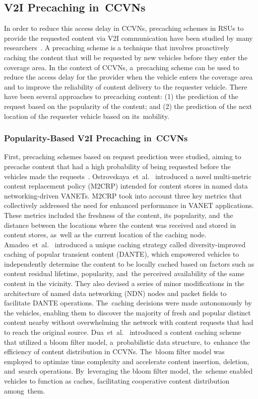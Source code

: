 \documentclass[sensors,aricle,accept,pdftex,moreauthors]{Definitions/mdpi}
\begin{document}
\subsection{V2I Precaching in~CCVNs}
In order to reduce this access delay in CCVNs, precaching schemes in RSUs to provide the requested content via V2I communication have been studied by many researchers~\cite{Ostrovskaya2018, Amadeo2021, Dua2019, Zhe2020, Park2019, Khelifi2018}.
A precaching scheme is a technique that involves proactively caching the content that will be requested by new vehicles before they enter the coverage area.
In the context of CCVNs, a~precaching scheme can be used to reduce the access delay for the provider when the vehicle enters the coverage area and to improve the reliability of content delivery to the requester vehicle.
There have been several approaches to precaching content: (1) the prediction of the request based on the popularity of the content; and (2) the prediction of the next location of the requester vehicle based on its~mobility.
\subsubsection{Popularity-Based V2I Precaching in~CCVNs}
First, precaching schemes based on request prediction were studied, aiming to precache content that had a high probability of being requested before the vehicles made the requests~\cite{Ostrovskaya2018, Amadeo2021, Dua2019}.
Ostrovskaya~et~al.~\cite{Ostrovskaya2018} introduced a novel multi-metric content replacement policy (M2CRP) intended for content stores in {named data networking}-driven VANETs. M2CRP took into account three key metrics that collectively addressed the need for enhanced performance in VANET applications. These metrics included the freshness of the content, its popularity, and~the distance between the locations where the content was received and stored in content stores, as~well as the current location of the caching node.
Amadeo~et~al.~\cite{Amadeo2021} introduced a unique caching strategy called diversity-improved caching of popular transient content (DANTE), which empowered vehicles to independently determine the content to be locally cached based on factors such as content residual lifetime, popularity, and~the perceived availability of the same content in the vicinity. They also devised a series of minor modifications in the architecture of named data networking (NDN) nodes and packet fields to facilitate DANTE operations. The~caching decisions were made autonomously by the vehicles, enabling them to discover the majority of fresh and popular distinct content nearby without overwhelming the network with content requests that had to reach the original source.
Dua~et~al.~\cite{Dua2019} introduced a content caching scheme that utilized a bloom filter model, a~probabilistic data structure, to~enhance the efficiency of content distribution in CCVNs. The~bloom filter model was employed to optimize time complexity and accelerate content insertion, deletion, and~search operations. By~leveraging the bloom filter model, the~scheme enabled vehicles to function as caches, facilitating cooperative content distribution among~them.
\end{document}
